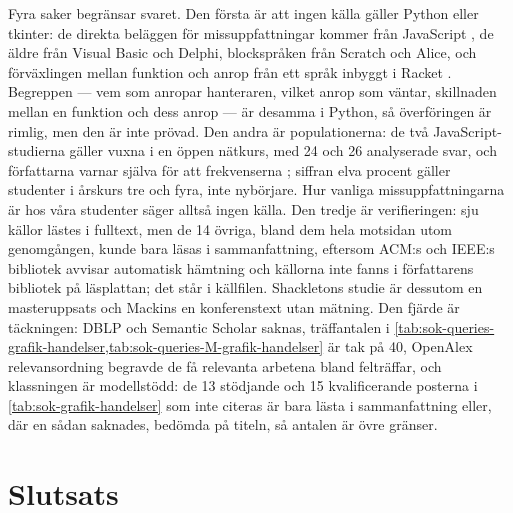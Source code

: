 Fyra saker begränsar svaret.  Den första är att ingen källa gäller
Python eller tkinter: de direkta beläggen för missuppfattningar kommer
från JavaScript \autocite{Lukkarinen2021Listener,Lehtinen2021Struggle},
de äldre från Visual Basic och Delphi, blockspråken från Scratch och
Alice, och förväxlingen mellan funktion och anrop från ett språk inbyggt
i Racket \autocite{LuKrishnamurthi2024}.  Begreppen --- vem som anropar
hanteraren, vilket anrop som väntar, skillnaden mellan en funktion och
dess anrop --- är desamma i Python, så överföringen är rimlig, men den är
inte prövad.  Den andra är populationerna: de två JavaScript-studierna
gäller vuxna i en öppen nätkurs, med 24 och 26 analyserade svar, och
författarna varnar själva för att frekvenserna
; siffran elva procent gäller studenter i årskurs tre
och fyra, inte nybörjare.  Hur vanliga missuppfattningarna är hos våra
studenter säger alltså ingen källa.  Den tredje är verifieringen: sju
källor lästes i fulltext, men de 14 övriga, bland dem hela motsidan
utom genomgången, kunde bara läsas i sammanfattning, eftersom ACM:s och
IEEE:s bibliotek avvisar automatisk hämtning och källorna inte fanns i
författarens bibliotek på läsplattan; det står i källfilen.  Shackletons
studie är dessutom en masteruppsats och Mackins en konferenstext utan
mätning.  Den fjärde är täckningen: DBLP och Semantic
Scholar saknas, träffantalen i
\cref{tab:sok-queries-grafik-handelser,tab:sok-queries-M-grafik-handelser}
är tak på 40, OpenAlex relevansordning begravde de få relevanta
arbetena bland felträffar, och klassningen är modellstödd: de 13
stödjande och 15 kvalificerande posterna i
\cref{tab:sok-grafik-handelser} som inte citeras är bara lästa i
sammanfattning eller, där en sådan saknades, bedömda på titeln, så
antalen är övre gränser.

\section{Slutsats}
\label{sec:handelser-slutsats-grafik}

